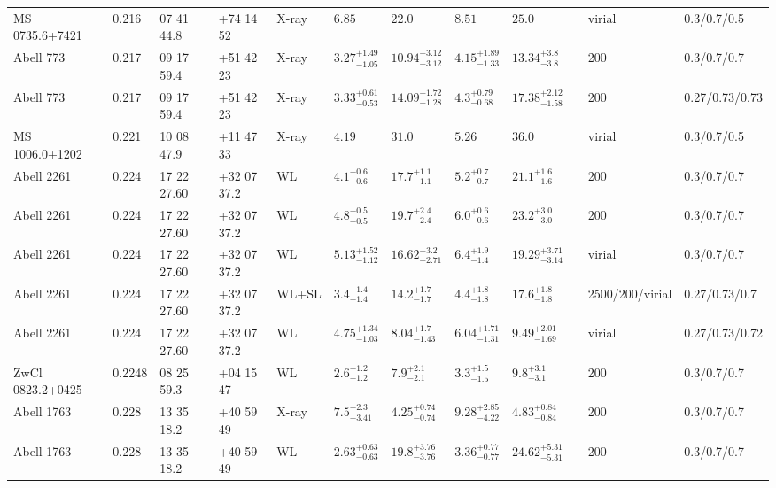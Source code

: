\begin{landscape}
\begin{center}
{\begin{longtable}{llllllllllll}
MS 0735.6+7421 & 0.216 & 07 41 44.8 & +74 14 52 & X-ray & ${6.85}^{}_{}$ & ${22.0}^{}_{}$ & ${8.51}^{}_{}$ & ${25.0}^{}_{}$ & \citet{MO99.1} & virial & 0.3/0.7/0.5 \\
Abell 773 & 0.217 & 09 17 59.4 & +51 42 23 & X-ray & ${3.27}^{+1.49}_{-1.05}$ & ${10.94}^{+3.12}_{-3.12}$ & ${4.15}^{+1.89}_{-1.33}$ & ${13.34}^{+3.8}_{-3.8}$ & \citet{ET11.1} & 200 & 0.3/0.7/0.7 \\
Abell 773 & 0.217 & 09 17 59.4 & +51 42 23 & X-ray & ${3.33}^{+0.61}_{-0.53}$ & ${14.09}^{+1.72}_{-1.28}$ & ${4.3}^{+0.79}_{-0.68}$ & ${17.38}^{+2.12}_{-1.58}$ & \citet{BA14.1} & 200 & 0.27/0.73/0.73 \\
MS 1006.0+1202 & 0.221 & 10 08 47.9 & +11 47 33 & X-ray & ${4.19}^{}_{}$ & ${31.0}^{}_{}$ & ${5.26}^{}_{}$ & ${36.0}^{}_{}$ & \citet{MO99.1} & virial & 0.3/0.7/0.5 \\
Abell 2261 & 0.224 & 17 22 27.60 & +32 07 37.2 & WL & ${4.1}^{+0.6}_{-0.6}$ & ${17.7}^{+1.1}_{-1.1}$ & ${5.2}^{+0.7}_{-0.7}$ & ${21.1}^{+1.6}_{-1.6}$ & \citet{SE14.1} & 200 & 0.3/0.7/0.7 \\
Abell 2261 & 0.224 & 17 22 27.60 & +32 07 37.2 & WL & ${4.8}^{+0.5}_{-0.5}$ & ${19.7}^{+2.4}_{-2.4}$ & ${6.0}^{+0.6}_{-0.6}$ & ${23.2}^{+3.0}_{-3.0}$ & \citet{SE14.1} & 200 & 0.3/0.7/0.7 \\
Abell 2261 & 0.224 & 17 22 27.60 & +32 07 37.2 & WL & ${5.13}^{+1.52}_{-1.12}$ & ${16.62}^{+3.2}_{-2.71}$ & ${6.4}^{+1.9}_{-1.4}$ & ${19.29}^{+3.71}_{-3.14}$ & \citet{UM09.1} & virial & 0.3/0.7/0.7 \\
Abell 2261 & 0.224 & 17 22 27.60 & +32 07 37.2 & WL+SL & ${3.4}^{+1.4}_{-1.4}$ & ${14.2}^{+1.7}_{-1.7}$ & ${4.4}^{+1.8}_{-1.8}$ & ${17.6}^{+1.8}_{-1.8}$ & \citet{ME14.1} & 2500/200/virial & 0.27/0.73/0.7 \\
Abell 2261 & 0.224 & 17 22 27.60 & +32 07 37.2 & WL & ${4.75}^{+1.34}_{-1.03}$ & ${8.04}^{+1.7}_{-1.43}$ & ${6.04}^{+1.71}_{-1.31}$ & ${9.49}^{+2.01}_{-1.69}$ & \citet{OK10.1} & virial & 0.27/0.73/0.72 \\
ZwCl 0823.2+0425 & 0.2248 & 08 25 59.3 & +04 15 47 & WL & ${2.6}^{+1.2}_{-1.2}$ & ${7.9}^{+2.1}_{-2.1}$ & ${3.3}^{+1.5}_{-1.5}$ & ${9.8}^{+3.1}_{-3.1}$ & \citet{SE14.1} & 200 & 0.3/0.7/0.7 \\
Abell 1763 & 0.228 & 13 35 18.2 & +40 59 49 & X-ray & ${7.5}^{+2.3}_{-3.41}$ & ${4.25}^{+0.74}_{-0.74}$ & ${9.28}^{+2.85}_{-4.22}$ & ${4.83}^{+0.84}_{-0.84}$ & \citet{ET11.1} & 200 & 0.3/0.7/0.7 \\
Abell 1763 & 0.228 & 13 35 18.2 & +40 59 49 & WL & ${2.63}^{+0.63}_{-0.63}$ & ${19.8}^{+3.76}_{-3.76}$ & ${3.36}^{+0.77}_{-0.77}$ & ${24.62}^{+5.31}_{-5.31}$ & \citet{BA07.1} & 200 & 0.3/0.7/0.7 \\

\end{longtable}}
\end{center}
\end{landscape}
